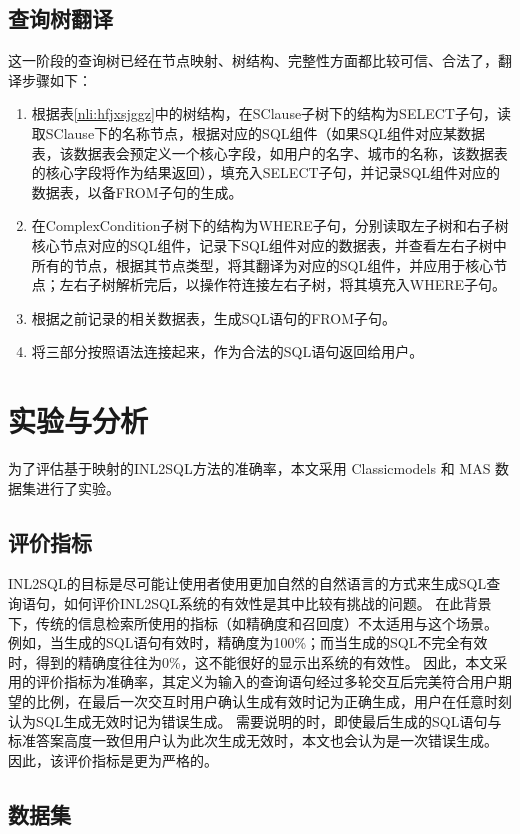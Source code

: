 \subsection{查询树翻译}
\label{nli:cxsfy}
这一阶段的查询树已经在节点映射、树结构、完整性方面都比较可信、合法了，翻译步骤如下：
\begin{enumerate}
    \item 根据表\ref{nli:hfjxsjggz}中的树结构，在SClause子树下的结构为SELECT子句，读取SClause下的名称节点，根据对应的SQL组件（如果SQL组件对应某数据表，该数据表会预定义一个核心字段，如用户的名字、城市的名称，该数据表的核心字段将作为结果返回），填充入SELECT子句，并记录SQL组件对应的数据表，以备FROM子句的生成。
    \item 在ComplexCondition子树下的结构为WHERE子句，分别读取左子树和右子树核心节点对应的SQL组件，记录下SQL组件对应的数据表，并查看左右子树中所有的节点，根据其节点类型，将其翻译为对应的SQL组件，并应用于核心节点；左右子树解析完后，以操作符连接左右子树，将其填充入WHERE子句。
    \item 根据之前记录的相关数据表，生成SQL语句的FROM子句。
    \item 将三部分按照语法连接起来，作为合法的SQL语句返回给用户。
\end{enumerate}

\section{实验与分析}
为了评估基于映射的INL2SQL方法的准确率，本文采用 Classicmodels 和 MAS 数据集进行了实验。
\subsection{评价指标}
INL2SQL的目标是尽可能让使用者使用更加自然的自然语言的方式来生成SQL查询语句，如何评价INL2SQL系统的有效性是其中比较有挑战的问题。
在此背景下，传统的信息检索所使用的指标（如精确度和召回度）不太适用与这个场景。
例如，当生成的SQL语句有效时，精确度为100\%；而当生成的SQL不完全有效时，得到的精确度往往为0\%，这不能很好的显示出系统的有效性。
因此，本文采用的评价指标为准确率，其定义为输入的查询语句经过多轮交互后完美符合用户期望的比例，在最后一次交互时用户确认生成有效时记为正确生成，用户在任意时刻认为SQL生成无效时记为错误生成。
需要说明的时，即使最后生成的SQL语句与标准答案高度一致但用户认为此次生成无效时，本文也会认为是一次错误生成。
因此，该评价指标是更为严格的。

\subsection{数据集}

